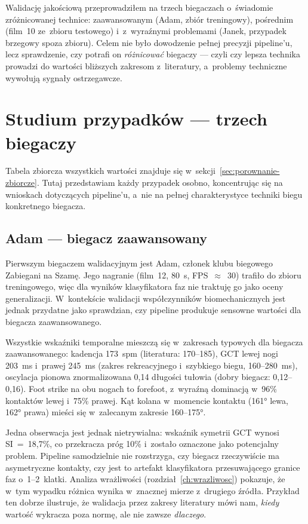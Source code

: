 Walidację jakościową przeprowadziłem na trzech biegaczach o~świadomie zróżnicowanej technice: zaawansowanym (Adam, zbiór treningowy), pośrednim (film~10 ze~zbioru testowego) i~z~wyraźnymi problemami (Janek, przypadek brzegowy spoza zbioru). Celem nie było dowodzenie pełnej precyzji pipeline'u, lecz sprawdzenie, czy potrafi on \textit{różnicować} biegaczy --- czyli czy lepsza technika prowadzi do wartości bliższych zakresom z~literatury, a~problemy techniczne wywołują sygnały ostrzegawcze.

\section{Studium przypadków --- trzech biegaczy}
\label{sec:case-studies}

Tabela zbiorcza wszystkich wartości znajduje się w~sekcji~\ref{sec:porownanie-zbiorcze}. Tutaj przedstawiam każdy przypadek osobno, koncentrując się na wnioskach dotyczących pipeline'u, a~nie na pełnej charakterystyce techniki biegu konkretnego biegacza.

\subsection{Adam --- biegacz zaawansowany}
\label{sec:case-adam}

Pierwszym biegaczem walidacyjnym jest Adam, członek klubu biegowego Zabiegani na Szamę. Jego nagranie (film~12, 80~s, FPS~$\approx$~30) trafiło do zbioru treningowego, więc dla wyników klasyfikatora faz nie traktuję go jako oceny generalizacji. W~kontekście walidacji współczynników biomechanicznych jest jednak przydatne jako sprawdzian, czy pipeline produkuje sensowne wartości dla biegacza zaawansowanego.

Wszystkie wskaźniki temporalne mieszczą się w~zakresach typowych dla biegacza zaawansowanego: kadencja 173~spm (literatura: 170--185), GCT lewej nogi 203~ms i~prawej 245~ms (zakres rekreacyjnego i~szybkiego biegu, 160--280~ms), oscylacja pionowa znormalizowana 0{,}14 długości tułowia (dobry biegacz: 0{,}12--0{,}16). Foot strike na obu nogach to forefoot, z~wyraźną dominacją w~96\% kontaktów lewej i~75\% prawej. Kąt kolana w~momencie kontaktu (161° lewa, 162° prawa) mieści się w~zalecanym zakresie 160--175°.

Jedna obserwacja jest jednak nietrywialna: wskaźnik symetrii GCT wynosi SI~=~18{,}7\%, co przekracza próg 10\% i~zostało oznaczone jako potencjalny problem. Pipeline samodzielnie nie rozstrzyga, czy biegacz rzeczywiście ma asymetryczne kontakty, czy jest to artefakt klasyfikatora przesuwającego granice faz o~1--2~klatki. Analiza wrażliwości (rozdział~\ref{ch:wrazliwosc}) pokazuje, że w~tym wypadku różnica wynika w~znacznej mierze z~drugiego źródła. Przykład ten dobrze ilustruje, że walidacja przez zakresy literatury mówi nam, \textit{kiedy} wartość wykracza poza normę, ale nie zawsze \textit{dlaczego}.

